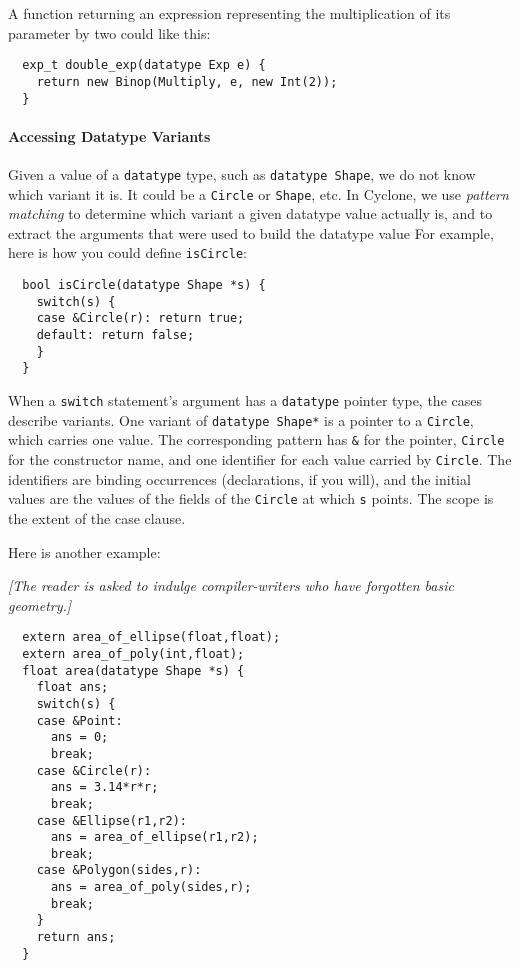 A function returning an expression representing the multiplication of
its parameter by two could like this:
\begin{verbatim}
  exp_t double_exp(datatype Exp e) {
    return new Binop(Multiply, e, new Int(2));
  }
\end{verbatim}

\paragraph{Accessing Datatype Variants} Given a value of a \texttt{datatype}
type, such as \texttt{datatype Shape}, we do not know which variant it is.
It could be a \texttt{Circle} or \texttt{Shape}, etc.  In Cyclone, we
use \emph{pattern matching} to determine which variant a given datatype
value actually is, and to extract the arguments that were used to
build the datatype value  For example, here is how you could define
\texttt{isCircle}:
\begin{verbatim}
  bool isCircle(datatype Shape *s) {
    switch(s) {
    case &Circle(r): return true;
    default: return false;
    }
  }
\end{verbatim}

When a \texttt{switch} statement's argument has a \texttt{datatype} 
pointer type,
the cases describe variants.  One variant of \texttt{datatype Shape*} is a
pointer to a \texttt{Circle}, which carries one value.  The
corresponding pattern has \texttt{\&} for the pointer, \texttt{Circle} for
the constructor name, and one identifier for each value carried by
\texttt{Circle}.  The identifiers are binding occurrences (declarations,
if you will), and the initial values are the values of the fields of
the \texttt{Circle} at which \texttt{s} points.  The scope is the extent
of the case clause.  

Here is another example:

\textit{[The reader is asked to indulge compiler-writers who have
  forgotten basic geometry.]}
\begin{verbatim}
  extern area_of_ellipse(float,float);
  extern area_of_poly(int,float);
  float area(datatype Shape *s) {
    float ans;
    switch(s) {
    case &Point:
      ans = 0;
      break;
    case &Circle(r):
      ans = 3.14*r*r;
      break;
    case &Ellipse(r1,r2):
      ans = area_of_ellipse(r1,r2);
      break;
    case &Polygon(sides,r):
      ans = area_of_poly(sides,r);
      break;
    }
    return ans;
  }
\end{verbatim}

